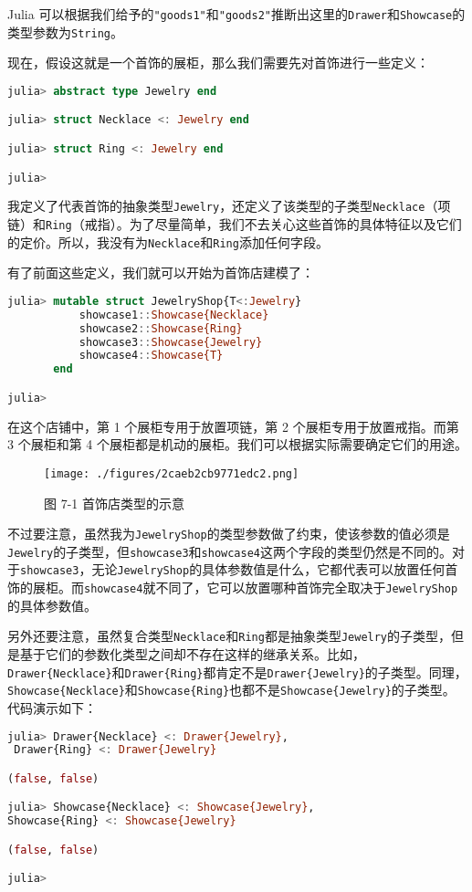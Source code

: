 Julia 可以根据我们给予的\verb`"goods1"`和\verb`"goods2"`推断出这里的\verb`Drawer`和\verb`Showcase`的类型参数为\verb`String`。

现在，假设这就是一个首饰的展柜，那么我们需要先对首饰进行一些定义：
\begin{lstlisting}[language=julia]
julia> abstract type Jewelry end

julia> struct Necklace <: Jewelry end

julia> struct Ring <: Jewelry end

julia> 
\end{lstlisting}

我定义了代表首饰的抽象类型\verb`Jewelry`，还定义了该类型的子类型\verb`Necklace`（项链）和\verb`Ring`（戒指）。为了尽量简单，我们不去关心这些首饰的具体特征以及它们的定价。所以，我没有为\verb`Necklace`和\verb`Ring`添加任何字段。

有了前面这些定义，我们就可以开始为首饰店建模了：
\begin{lstlisting}[language=julia]
julia> mutable struct JewelryShop{T<:Jewelry}
           showcase1::Showcase{Necklace}
           showcase2::Showcase{Ring}
           showcase3::Showcase{Jewelry}
           showcase4::Showcase{T}
       end

julia> 
\end{lstlisting}

在这个店铺中，第 1 个展柜专用于放置项链，第 2 个展柜专用于放置戒指。而第 3 个展柜和第 4 个展柜都是机动的展柜。我们可以根据实际需要确定它们的用途。
\begin{figure}[ht]
\centering
\texttt{[image: ./figures/2caeb2cb9771edc2.png]}
\caption{图 7-1 首饰店类型的示意} \label{fig_JuC7S1_1}
\end{figure}

不过要注意，虽然我为\verb`JewelryShop`的类型参数做了约束，使该参数的值必须是\verb`Jewelry`的子类型，但\verb`showcase3`和\verb`showcase4`这两个字段的类型仍然是不同的。对于\verb`showcase3`，无论\verb`JewelryShop`的具体参数值是什么，它都代表可以放置任何首饰的展柜。而\verb`showcase4`就不同了，它可以放置哪种首饰完全取决于\verb`JewelryShop`的具体参数值。

另外还要注意，虽然复合类型\verb`Necklace`和\verb`Ring`都是抽象类型\verb`Jewelry`的子类型，但是基于它们的参数化类型之间却不存在这样的继承关系。比如，\verb`Drawer{Necklace}`和\verb`Drawer{Ring}`都肯定不是\verb`Drawer{Jewelry}`的子类型。同理，\verb`Showcase{Necklace}`和\verb`Showcase{Ring}`也都不是\verb`Showcase{Jewelry}`的子类型。代码演示如下：
\begin{lstlisting}[language=julia]
julia> Drawer{Necklace} <: Drawer{Jewelry},
 Drawer{Ring} <: Drawer{Jewelry}

(false, false)

julia> Showcase{Necklace} <: Showcase{Jewelry}, 
Showcase{Ring} <: Showcase{Jewelry}

(false, false)

julia> 
\end{lstlisting}

